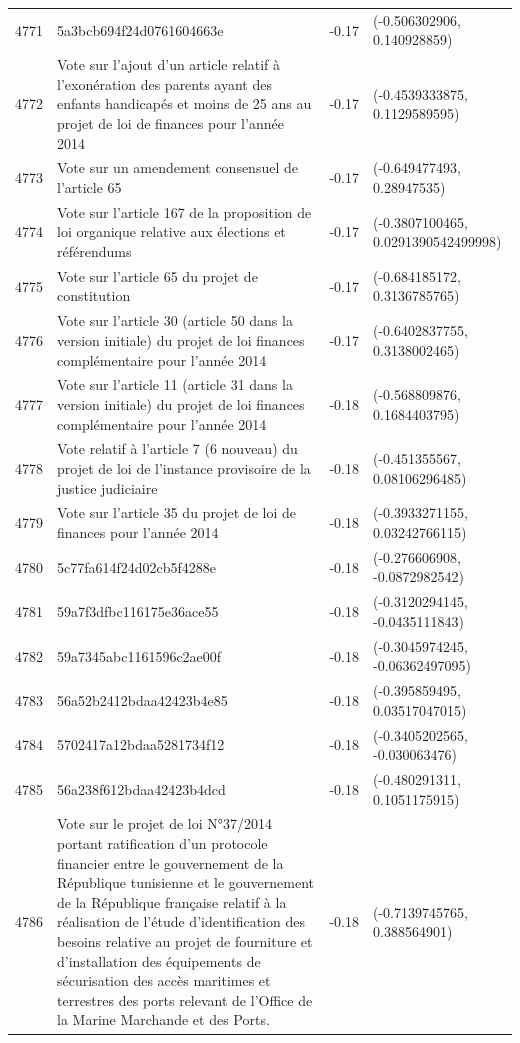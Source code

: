 \begin{table}[ht]
\begin{tabular}{rlrl}
  4771 & 5a3bcb694f24d0761604663e & -0.17 & (-0.506302906, 0.140928859) \\ 
  4772 & Vote sur l'ajout d'un article relatif à l'exonération des parents ayant des enfants handicapés et moins de 25 ans au projet de loi de finances pour l'année 2014 & -0.17 & (-0.4539333875, 0.1129589595) \\ 
  4773 & Vote sur un amendement consensuel de l'article 65 & -0.17 & (-0.649477493, 0.28947535) \\ 
  4774 & Vote sur l'article 167 de la proposition de loi organique relative aux élections et référendums & -0.17 & (-0.3807100465, 0.0291390542499998) \\ 
  4775 & Vote sur l'article 65 du projet de constitution & -0.17 & (-0.684185172, 0.3136785765) \\ 
  4776 & Vote sur l'article 30 (article 50 dans la version initiale) du projet de loi finances complémentaire pour l'année 2014 & -0.17 & (-0.6402837755, 0.3138002465) \\ 
  4777 & Vote sur l'article 11 (article 31 dans la version initiale) du projet de loi finances complémentaire pour l'année 2014 & -0.18 & (-0.568809876, 0.1684403795) \\ 
  4778 & Vote relatif à l'article 7 (6 nouveau) du projet de loi de l'instance provisoire de la justice judiciaire & -0.18 & (-0.451355567, 0.08106296485) \\ 
  4779 & Vote sur l'article 35 du projet de loi de finances pour l'année 2014 & -0.18 & (-0.3933271155, 0.03242766115) \\ 
  4780 & 5c77fa614f24d02cb5f4288e & -0.18 & (-0.276606908, -0.0872982542) \\ 
  4781 & 59a7f3dfbc116175e36ace55 & -0.18 & (-0.3120294145, -0.0435111843) \\ 
  4782 & 59a7345abc1161596c2ae00f & -0.18 & (-0.3045974245, -0.06362497095) \\ 
  4783 & 56a52b2412bdaa42423b4e85 & -0.18 & (-0.395859495, 0.03517047015) \\ 
  4784 & 5702417a12bdaa5281734f12 & -0.18 & (-0.3405202565, -0.030063476) \\ 
  4785 & 56a238f612bdaa42423b4dcd & -0.18 & (-0.480291311, 0.1051175915) \\ 
  4786 & Vote sur le projet de loi N°37/2014 portant ratification d'un protocole financier entre le gouvernement de la République tunisienne et le gouvernement de la République française relatif à la réalisation de l'étude d'identification des besoins relative au projet de fourniture et d'installation des équipements de sécurisation des accès maritimes et terrestres des ports relevant de l'Office de la Marine Marchande et des Ports. & -0.18 & (-0.7139745765, 0.388564901) \\ 

\end{tabular}
\end{table}
